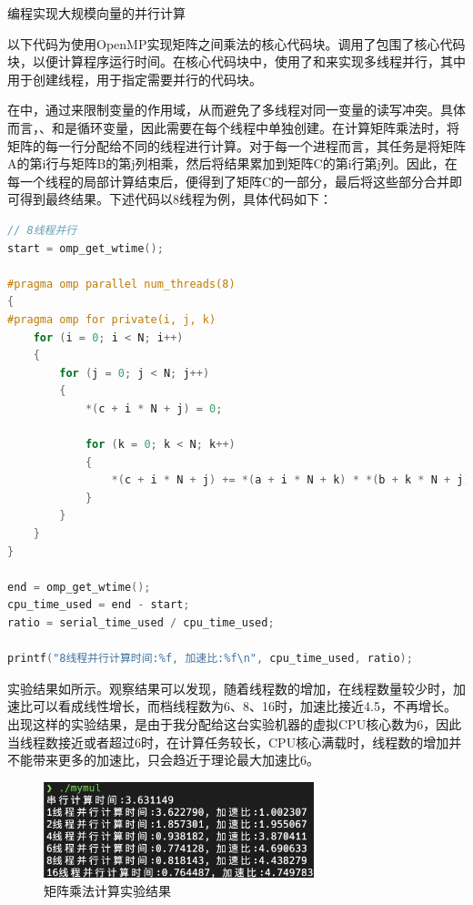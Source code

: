 \documentclass[lang=cn,a4paper,chinesefont=founder,bibend=bibtex]{shu-lab-report}
\begin{document}
\begin{tcolorbox}[title=要求5]
  编程实现大规模向量的并行计算
\end{tcolorbox}

以下代码为使用OpenMP实现矩阵之间乘法的核心代码块。调用了包围了核心代码块，以便计算程序运行时间。在核心代码块中，使用了和来实现多线程并行，其中用于创建线程，用于指定需要并行的代码块。

在中，通过来限制变量的作用域，从而避免了多线程对同一变量的读写冲突。具体而言，、和是循环变量，因此需要在每个线程中单独创建。在计算矩阵乘法时，将矩阵的每一行分配给不同的线程进行计算。对于每一个进程而言，其任务是将矩阵A的第i行与矩阵B的第j列相乘，然后将结果累加到矩阵C的第i行第j列。因此，在每一个线程的局部计算结束后，便得到了矩阵C的一部分，最后将这些部分合并即可得到最终结果。下述代码以8线程为例，具体代码如下：

\begin{lstlisting}[language=c]
// 8线程并行
start = omp_get_wtime();

#pragma omp parallel num_threads(8)
{
#pragma omp for private(i, j, k)
    for (i = 0; i < N; i++)
    {
        for (j = 0; j < N; j++)
        {
            *(c + i * N + j) = 0;

            for (k = 0; k < N; k++)
            {
                *(c + i * N + j) += *(a + i * N + k) * *(b + k * N + j);
            }
        }
    }
}

end = omp_get_wtime();
cpu_time_used = end - start;
ratio = serial_time_used / cpu_time_used;

printf("8线程并行计算时间:%f, 加速比:%f\n", cpu_time_used, ratio);
\end{lstlisting}

实验结果如所示。观察结果可以发现，随着线程数的增加，在线程数量较少时，加速比可以看成线性增长，而档线程数为6、8、16时，加速比接近4.5，不再增长。出现这样的实验结果，是由于我分配给这台实验机器的虚拟CPU核心数为6，因此当线程数接近或者超过6时，在计算任务较长，CPU核心满载时，线程数的增加并不能带来更多的加速比，只会趋近于理论最大加速比6。

\begin{figure}[htbp]
  \centering
  \includegraphics[width=0.7\textwidth]{image/3.jpg}
  \caption{矩阵乘法计算实验结果}
  \label{fig:3}
\end{figure}
\end{document}
